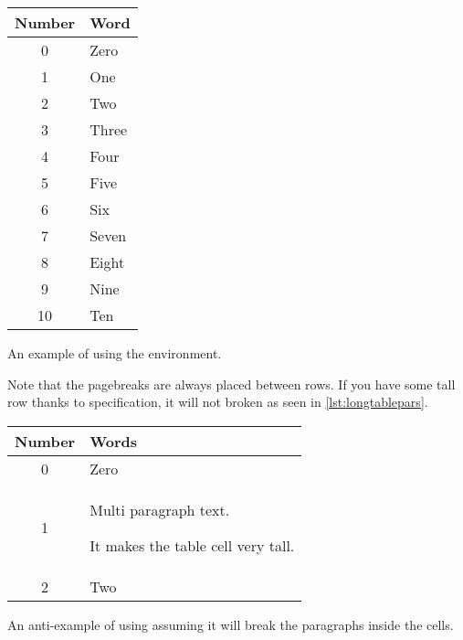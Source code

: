 \begin{listing}
  \begin{lined}{0.8\linewidth}
    \begin{example}[standalone, to_page=2, paperwidth=4.5cm, paperheight=3.5cm, vertical_pages]
\geometry{margin=0.1cm}
\usepackage{longtable}
\usepackage{booktabs}

\begin{longtable}{cl}
  \toprule
  Number & Word \\
  \midrule
  0      & Zero \\
  1      & One  \\
  2      & Two  \\
  3      & Three \\
  4      & Four  \\
  5      & Five  \\
  6      & Six   \\
  7      & Seven \\
  8      & Eight \\
  9      & Nine  \\
  10     & Ten  \\
  \bottomrule
\end{longtable}
\end{example}
  \end{lined}
  \caption{An example of using the  environment.}\label{lst:longtable}
\end{listing}

Note that the pagebreaks are always placed between rows. If you have some tall
row thanks to  specification, it will not broken as seen in
\autoref{lst:longtablepars}.
\begin{listing}
  \begin{lined}{12cm}
    \begin{example}[standalone, to_page=3, paperwidth=5.5cm, paperheight=2cm, vertical_pages]
\usepackage{longtable}
\usepackage{booktabs}

\begin{longtable}{
  cp{2cm}
}
  \toprule
  Number & Words              \\
  \midrule
  0      & Zero               \\
  1      & Multi paragraph
           text.

           It makes the table
           cell very tall.    \\
  2      & Two                \\
  \bottomrule
\end{longtable}
\end{example}
  \end{lined}

  \caption{An anti-example of using  assuming it will break
    the paragraphs inside the cells.}\label{lst:longtablepars}
\end{listing}

